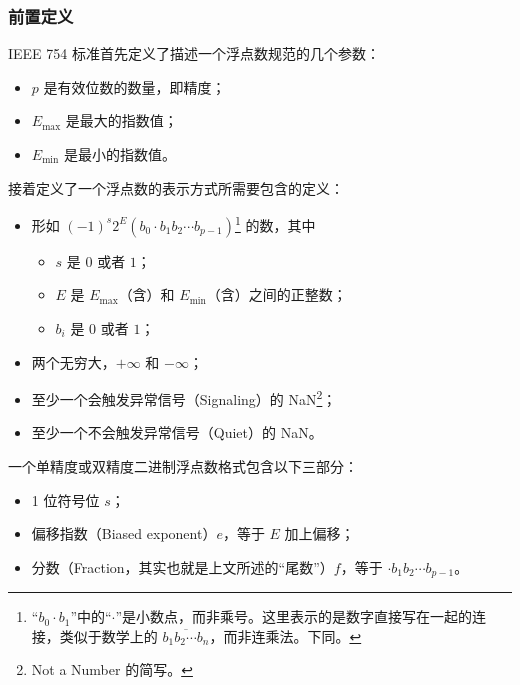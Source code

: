         \subsubsection{前置定义}\label{subsubsec:NumberSystemBasics/fixed-point-and-floating-point/ieee-754/predef}
            IEEE 754 标准首先定义了描述一个浮点数规范的几个参数：
            \begin{itemize}
                \item $p$ 是有效位数的数量，即精度；
                \item $E_{\max}$ 是最大的指数值；
                \item $E_{\min}$ 是最小的指数值。
            \end{itemize}

            接着定义了一个浮点数的表示方式所需要包含的定义：
            \begin{itemize}
                \item 形如 $(-1)^s2^E(b_0 \cdot b_1b_2 \cdots b_{p-1})$\footnote{“$b_0 \cdot b_1$”中的“$\cdot$”是小数点，而非乘号。这里表示的是数字直接写在一起的连接，类似于数学上的 $\overline{b_1b_2 \cdots b_n}$，而非连乘法。下同。} 的数，其中
                    \begin{itemize}
                        \item $s$ 是 $0$ 或者 $1$；
                        \item $E$ 是 $E_{\max}$（含）和 $E_{\min}$（含）之间的正整数；
                        \item $b_i$ 是 $0$ 或者 $1$；
                    \end{itemize}
                \item 两个无穷大，$+\infty$ 和 $-\infty$；
                \item 至少一个会触发异常信号（Signaling）的 NaN\footnote{Not a Number 的简写。}；
                \item 至少一个不会触发异常信号（Quiet）的 NaN。
            \end{itemize}

            一个单精度或双精度二进制浮点数格式包含以下三部分：
            \begin{itemize}
                \item 1 位符号位 $s$；
                \item 偏移指数（Biased exponent）$e$，等于 $E$ 加上偏移；
                \item 分数（Fraction，其实也就是上文所述的“尾数”）$f$，等于 $\cdot b_1b_2 \cdots b_{p-1}$。
            \end{itemize}


